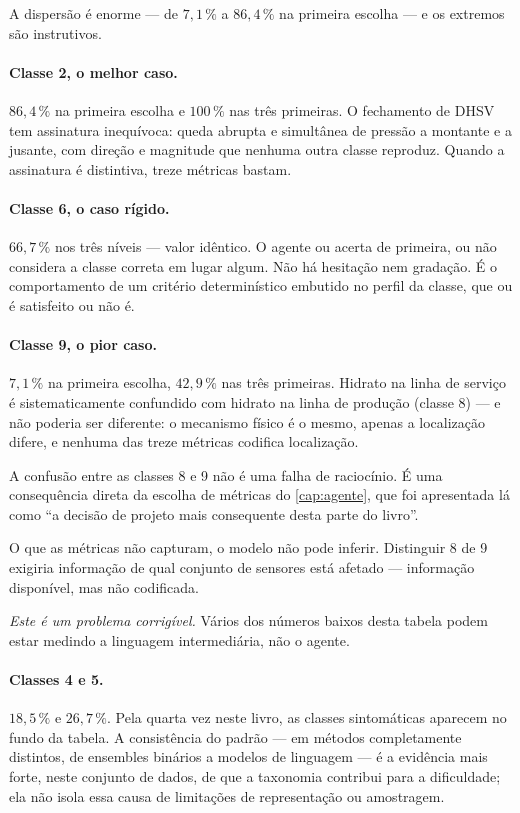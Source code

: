 A dispersão é enorme --- de $7{,}1\,\%$ a $86{,}4\,\%$ na primeira escolha --- e os
extremos são instrutivos.

\paragraph{Classe 2, o melhor caso.} $86{,}4\,\%$ na primeira escolha e $100\,\%$ nas
três primeiras. O fechamento de DHSV tem assinatura inequívoca: queda abrupta e
simultânea de pressão a montante e a jusante, com direção e magnitude que nenhuma outra
classe reproduz. Quando a assinatura é distintiva, treze métricas bastam.

\paragraph{Classe 6, o caso rígido.} $66{,}7\,\%$ nos três níveis --- valor idêntico. O
agente ou acerta de primeira, ou não considera a classe correta em lugar algum. Não há
hesitação nem gradação. É o comportamento de um critério determinístico embutido no
perfil da classe, que ou é satisfeito ou não é.

\paragraph{Classe 9, o pior caso.} $7{,}1\,\%$ na primeira escolha, $42{,}9\,\%$ nas três
primeiras. Hidrato na linha de serviço é sistematicamente confundido com hidrato na linha
de produção (classe 8) --- e não poderia ser diferente: o mecanismo físico é o mesmo,
apenas a localização difere, e nenhuma das treze métricas codifica localização.

\begin{destaque}
A confusão entre as classes 8 e 9 não é uma falha de raciocínio. É uma consequência
direta da escolha de métricas do \cref{cap:agente}, que foi apresentada lá como ``a
decisão de projeto mais consequente desta parte do livro''.

O que as métricas não capturam, o modelo não pode inferir. Distinguir 8 de 9 exigiria
informação de qual conjunto de sensores está afetado --- informação disponível, mas não
codificada.

\emph{Este é um problema corrigível.} Vários dos números baixos desta tabela podem estar
medindo a linguagem intermediária, não o agente.
\end{destaque}

\paragraph{Classes 4 e 5.} $18{,}5\,\%$ e $26{,}7\,\%$. Pela quarta vez neste livro, as
classes sintomáticas aparecem no fundo da tabela. A consistência do padrão --- em
métodos completamente distintos, de ensembles binários a modelos de linguagem --- é a
evidência mais forte, neste conjunto de dados, de que a taxonomia contribui para a
dificuldade; ela não isola essa causa de limitações de representação ou amostragem.

